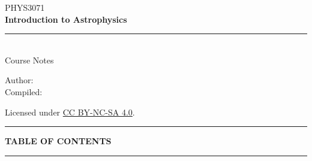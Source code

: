 \documentclass[12pt, a4paper, openright]{report}
\begin{document}
\null\vspace*{5.5cm}

\begin{center}
  {\small\color{StarGold}\textsc{\large PHYS3071}}\\[1.6em]
  {\fontsize{36}{44}\selectfont\bfseries\color{white}Introduction to Astrophysics}\\[2.0em]
  {\color{StarGold!55}\rule{6.0cm}{0.6pt}}\\[1.6em]
  {\color{white!65}\normalsize Course Notes}\\[4.0em]
\end{center}

\vfill

\begin{center}
  {\small\color{white!50}Author: \textit{\NoteAuthor}}\\[0.3em]
  {\small\color{white!50}Compiled: \textit{\CompileDate}}

  {
    \vspace*{1em}
    \small \color{white!50}
    Licensed under \href{https://creativecommons.org/licenses/by-nc-sa/4.0/}{CC BY-NC-SA 4.0}.\\
    \vspace{0.5em}
  }
\end{center}

\clearpage
\pagestyle{fancy}

\begin{center}
  {\color{StarGold}\rule{0.4\textwidth}{0.5pt}}
\end{center}
\vspace{0.8cm}
{\centering\Large\bfseries\color{DeepSpace}TABLE OF CONTENTS\par}
\vspace{0.8cm}
\begin{center}
  {\color{StarGold}\rule{0.4\textwidth}{0.5pt}}
\end{center}
\vspace{1.2cm}
{%
  \hypersetup{linkcolor=DeepSpace}%
  \makeatletter{}\makeatother
}
\clearpage










\end{document}
